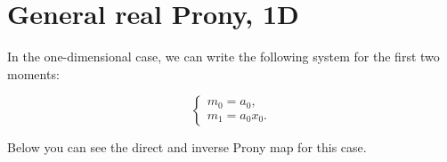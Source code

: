\section{General real Prony, 1D}
In the one-dimensional case, we can write the following system for the first two moments:

$$
\begin{cases}
m_0 = a_0, \\
m_1 = a_0 x_0.
\end{cases}
$$
  
Below you can see the direct and inverse Prony map for this case. 
  